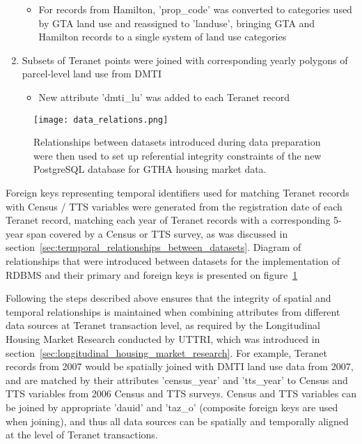 \begin{enumerate}
\begin{itemize}
        \item For records from Hamilton, 'prop\_code' was converted to categories used by GTA land use and reassigned to 'landuse', bringing GTA and Hamilton records to a single system of land use categories
    \end{itemize}
    \item Subsets of Teranet points were joined with corresponding yearly polygons of parcel-level land use from DMTI
    \begin{itemize}
        \item New attribute 'dmti\_lu' was added to each Teranet record
    \end{itemize}
\end{enumerate}

\begin{figure}[hbt!]
    \centering
    \texttt{[image: data\_relations.png]}
    \caption{Relationships between datasets introduced during data preparation were then used to set up referential integrity constraints of the new PostgreSQL database for GTHA housing market data.}
    \label{fig:data_relations}
\end{figure}

Foreign keys representing temporal identifiers used for matching Teranet records with Census / TTS variables were generated from the registration date of each Teranet record, matching each year of Teranet records with a corresponding 5-year span covered by a Census or TTS survey, as was discussed in section~\ref{sec:termporal_relationships_between_datasets}.
Diagram of relationships that were introduced between datasets for the implementation of RDBMS and their primary and foreign keys is presented on figure~\ref{fig:data_relations}

Following the steps described above ensures that the integrity of spatial and temporal relationships is maintained when combining attributes from different data sources at Teranet transaction level, as required by the Longitudinal Housing Market Research conducted by UTTRI, which was introduced in section~\ref{sec:longitudinal_housing_market_research}.
For example, Teranet records from 2007 would be spatially joined with DMTI land use data from 2007, and are matched by their attributes 'census\_year' and 'tts\_year' to Census and TTS variables from 2006 Census and TTS surveys.
Census and TTS variables can be joined by appropriate 'dauid' and 'taz\_o' (composite foreign keys are used when joining), and thus all data sources can be spatially and temporally aligned at the level of Teranet transactions.

